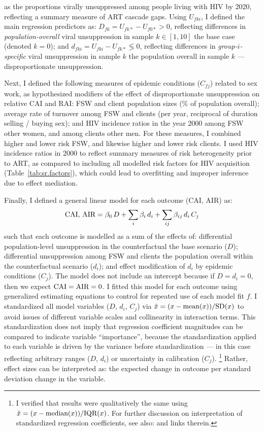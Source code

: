as the proportions virally unsuppressed among people living with HIV by 2020,
reflecting a summary measure of ART cascade gaps.
Using $U_{fki}$, I defined the main regression predictors as:
$D_{fk} = U_{fk*} - U_{f0*} > 0$, reflecting differences in
\emph{population-overall} viral unsuppression in sample $k \in [1,10]$
\vs the base case (denoted $k = 0$); and
$d_{fki} = U_{fki} - U_{fk*} \lessgtr 0$, reflecting differences in
\emph{group-$i$-specific} viral unsuppression in sample $k$
\vs the population overall in sample $k$ --- \ie disproportionate unsuppression.
\par
Next, I defined the following measures of epidemic conditions ($C_{fj}$) related to sex work,
as hypothesized modifiers of the effect of disproportionate unsuppression on relative CAI and RAI:
FSW and client population sizes (\% of population overall);
average rate of turnover among FSW and clients
(per year, reciprocal of duration selling / buying sex); and
HIV incidence ratios in the year 2000 among FSW \vs other women, and among clients \vs other men.
For these measures, I combined higher and lower risk FSW,
and likewise higher and lower risk clients.
I used HIV incidence ratios in 2000 to reflect
summary measures of risk heterogeneity prior to ART,
as compared to including all modelled risk factors
for HIV acquisition (\eg Table~\ref{tab:sr.factors}),
which could lead to overfitting and improper inference due to effect mediation.
\par
Finally, I defined a general linear model for each outcome (CAI, AIR) as:
\begin{equation}\label{eq:art.glm}
  \textnormal{CAI, AIR} = \beta_0\,D
                 + \sum_i \beta_i\,d_i
                 + \sum_{ij} \beta_{ij}\,d_i\,C_j
\end{equation}
such that each outcome is modelled as a sum of the effects of:
differential population-level unsuppression in the counterfactual
\vs the base scenario ($D$);
differential unsuppression among FSW and clients
\vs the population overall within the counterfactual scenario ($d_i$); and
effect modification of $d_i$ by epidemic conditions ($C_j$).
The model does not include an intercept because if $D = d_i = 0$,
then we expect $\textnormal{CAI} = \textnormal{AIR} = 0$.
I fitted this model for each outcome using generalized estimating equations \cite{Halekoh2006}
to control for repeated use of each model fit $f$.
I standardized all model variables ($D$, $d_i$, $C_j$) via
$\hat{x} = (x - \textnormal{mean}(x)) / \textnormal{SD}(x)$
to avoid issues of different variable scales and collinearity in interaction terms.
This standardization does not imply that
regression coefficient magnitudes can be compared to indicate variable ``importance'',
because the standardization applied to each variable is driven
by the variance before standardization
--- in this case reflecting arbitrary ranges ($D$, $d_i$) or uncertainty in calibration ($C_j$).%
\footnote{I verified that results were qualitatively the same using
  $\hat{x} = (x - \textnormal{median}(x)) / \textnormal{IQR}(x)$.
  For further discussion on interpretation of standardized regression coefficients,
  see also:  and links therein.}
Rather, effect sizes can be interpreted as:
the expected change in outcome per standard deviation change in the variable.
